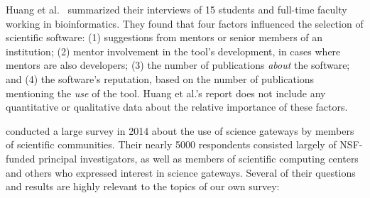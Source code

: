 \documentclass{casicswhitepaper}
\begin{document}
Huang et al.~\cite{huang2013provenance} summarized their interviews of 15 students and full-time faculty working in bioinformatics.  They found that four factors influenced the selection of scientific software: (1) suggestions from mentors or senior members of an institution; (2) mentor involvement in the tool's development, in cases where mentors are also developers; (3) the number of publications \emph{about} the software; and (4) the software's reputation, based on the number of publications mentioning the \emph{use} of the tool.  Huang et al.'s report does not include any quantitative or qualitative data about the relative importance of these factors.

\citet{lawrence2015science, lawrence2014who} conducted a large survey in 2014 about the use of science gateways by members of scientific communities.  Their nearly 5000 respondents consisted largely of NSF-funded principal investigators, as well as members of scientific computing centers and others who expressed interest in science gateways.  Several of their questions and results are highly relevant to the topics of our own survey:
\end{document}
